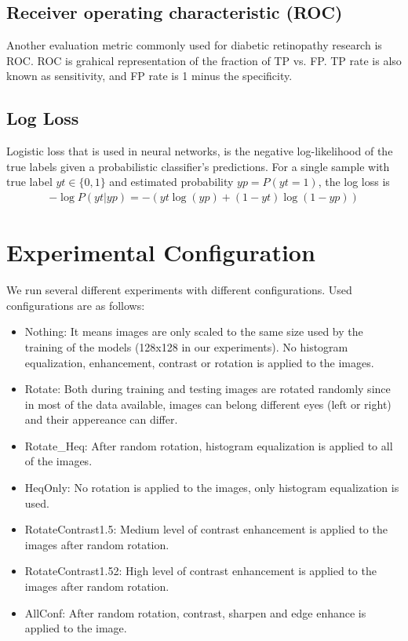 \subsection{Receiver operating characteristic (ROC)}
Another evaluation metric commonly used for diabetic retinopathy research is ROC. ROC is grahical representation of the fraction of TP  vs. FP. TP rate is also known as sensitivity, and FP rate is 1 minus the specificity. 

\subsection{Log Loss}
Logistic loss that is used in neural networks, is the negative log-likelihood of the true labels given a probabilistic classifier’s predictions. For a single sample with true label $\textit{yt} \in \{0,1\}$ and estimated probability $\textit{yp} = P(\textit{yt} = 1)$, the log loss is
\begin{align*}
    -\log P(yt|\textit{yp}) = -(\textit{yt} \log(\textit{yp}) + (1 - \textit{yt}) \log(1 - \textit{yp}))  
\end{align*}

\section{Experimental Configuration}
We run several different experiments with different configurations. Used configurations are as follows:

\begin{itemize}
    \item Nothing: It means images are only scaled to the same size used by the training of the models (128x128 in our experiments). No histogram equalization, enhancement, contrast or rotation is applied to the images. 
    \item Rotate: Both during training and testing images are rotated randomly since in most of the data available, images can belong different eyes (left or right) and their appereance can differ. 
    \item Rotate\_Heq: After random rotation, histogram equalization is applied to all of the images. 
    \item HeqOnly: No rotation is applied to the images, only histogram equalization is used. 
    \item RotateContrast1.5: Medium level of contrast enhancement is applied to the images after random rotation.
    \item RotateContrast1.52: High level of contrast enhancement is applied to the images after random rotation.
    \item AllConf: After random rotation, contrast, sharpen and edge enhance is applied to the image.
\end{itemize}


